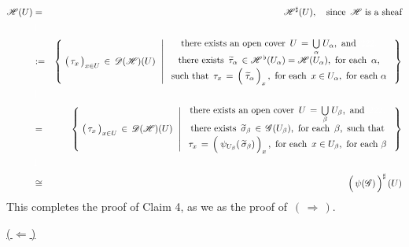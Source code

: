 \begin{eqnarray*}
\mathscr{H}(U)
& = &
	\mathscr{H}^{\sharp}(U),
	\quad
	\textnormal{since \,$\mathscr{H}$ is a sheaf}
\\ & {\color{white}\textnormal{\large$1$}} &
\\
& := &
	\left\{\;
		\left(\,\overset{{\color{white}.}}{\tau_{x}}\,\right)_{x \in U} \,\in\, \mathscr{D}(\mathscr{H})(U)
		\;\,\left\vert\;
			\begin{array}{c}
			\textnormal{there exists an open cover \,$U \,=\, \underset{\alpha}{\bigcup}\;U_{\alpha}$,\, and{\color{white}2222.}}
			\\
			\textnormal{there exists \,$\widetilde{\tau}_{\alpha} \,\in \mathscr{H}^{\,\flat}(U_{\alpha}) = \mathscr{H}(U_{\alpha})$,\, for each \,$\alpha$,}
			\\
			\textnormal{such that \,$\overset{{\color{white}\textnormal{\normalsize$1$}}}{\tau_{x}} \,=\, \left(\;\overset{{\color{white}.}}{\widetilde{\tau}_{\alpha}}\,\right)_{x}$\,,\, for each \,$x \in U_{\alpha}$,\, for each $\alpha$}
			\end{array}
			\right.
		\,\right\}
\\ & {\color{white}\textnormal{\large$1$}} &
\\
& = &
	\left\{\;
		\left(\,\overset{{\color{white}.}}{\tau_{x}}\,\right)_{x \in U} \,\in\, \mathscr{D}(\mathscr{H})(U)
		\;\,\left\vert\;
			\begin{array}{c}
			\textnormal{there exists an open cover \,$U \,=\, \underset{\beta}{\bigcup}\;U_{\beta}$,\, and{\color{white}2222.}}
			\\
			\textnormal{there exists \,$\widetilde{\sigma}_{\beta} \,\in\, \mathscr{G}(U_{\beta})$,\, for each \,$\beta$,\, such that}
			\\
			\textnormal{$\overset{{\color{white}\textnormal{\normalsize$1$}}}{\tau_{x}} \,=\, \left(\;\overset{{\color{white}.}}{\psi_{U_{\beta}}(\,\widetilde{\sigma}_{\beta})}\,\right)_{x}$\,,\, for each \,$x \in U_{\beta}$,\, for each $\beta$}
			\end{array}
			\right.
		\,\right\}
\\ & {\color{white}\textnormal{\large$1$}} &
\\
& \cong &
	\left(\,\overset{{\color{white}.}}{\psi(\mathscr{G})}\,\right)^{\sharp}(U)
\end{eqnarray*}
This completes the proof of Claim 4, as we as the proof of \,$(\,\Longrightarrow\,)$.

\vskip 0.5cm
\noindent
\underline{(\,$\Longleftarrow$\,)}\quad

